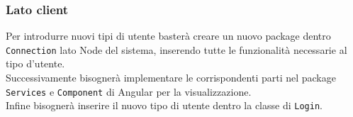 \subsubsection{Lato client}
Per introdurre nuovi tipi di utente basterà creare un nuovo package dentro \texttt{Connection} lato Node del sistema, inserendo tutte le funzionalità necessarie al tipo d'utente. \\Successivamente bisognerà implementare le corrispondenti parti nel package \texttt{Services} e \texttt{Component} di Angular per la visualizzazione. \\Infine bisognerà inserire il nuovo tipo di utente dentro la classe di \texttt{Login}.